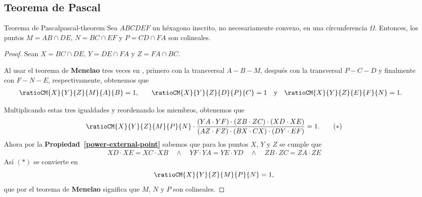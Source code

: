 \subsection{Teorema de Pascal}

\begin{section-theorem.tcb}{Teorema de Pascal}{pascal-theorem}
    Sea $ABCDEF$ un héxagono inscrito, no necesariamente convexo, en una círcunferencia $\Omega$.
    Entonces, los puntos $M = AB \cap DE$, $N = BC \cap EF$ y $P = CD \cap FA$ son colineales.
\end{section-theorem.tcb}

\begin{proof}
    Sean $X = BC \cap DE$, $Y = DE \cap FA$ y $Z = FA \cap BC$.


    \begin{figure}[H]
        \centering
        
    \end{figure}
    Al usar el teorema de \textbf{Menelao} tres veces en , primero con la transversal $A - B - M$, después con la transversal $P - C - D$ y finalmente con $F - N - E$, respectivamente, obtenemos que
    \begin{align*}
        &\ratioCM{X}{Y}{Z}{M}{A}{B} = 1, &&
        &\ratioCM{X}{Y}{Z}{D}{P}{C} = 1 &&\text{y}&&
        &\ratioCM{X}{Y}{Z}{E}{F}{N} = 1.
    \end{align*}

    Multiplicando estas tres igualdades y reordenando los miembros, obtenemos que
    \begin{align*}
        \ratioCM{X}{Y}{Z}{M}{P}{N} \cdot \frac{(YA\cdot YF) \cdot (ZB\cdot ZC) \cdot (XD\cdot XE)}{(AZ\cdot FZ) \cdot (BX \cdot CX) \cdot (DY\cdot EF)} = 1. \tag{$\ast$}
    \end{align*}
    Ahora por la \textbf{Propiedad~\ref{power-external-point}} sabemos que para los puntos $X$, $Y$ y $Z$ se cumple que
    \begin{align*}
        XD \cdot XE = XC \cdot XB \quad \land \quad
        YF \cdot YA = YE \cdot YD \quad \land \quad
        ZB \cdot ZC = ZA \cdot ZE
    \end{align*}
    Así $(\ast)$ se convierte en
    \[
        \ratioCM{X}{Y}{Z}{M}{P}{N} = 1,
    \]
    que por el teorema de \textbf{Menelao} significa que $M$, $N$ y $P$ son colineales.
\end{proof}

